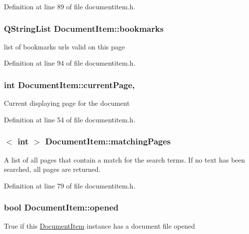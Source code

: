 Definition at line 89 of file documentitem.\+h.

\hypertarget{classDocumentItem_a08ec9ecae239f79e0e806efa28cc22b0}{
\subsubsection[{bookmarks}]{\setlength{\rightskip}{0pt plus 5cm}Q\+String\+List Document\+Item\+::bookmarks\hspace{0.3cm}{\ttfamily [read]}}}\label{classDocumentItem_a08ec9ecae239f79e0e806efa28cc22b0}
list of bookmarks urls valid on this page 

Definition at line 94 of file documentitem.\+h.

\hypertarget{classDocumentItem_aaf0a1ffedca483ef328739112fb2793b}{
\subsubsection[{current\+Page}]{\setlength{\rightskip}{0pt plus 5cm}int Document\+Item\+::current\+Page\hspace{0.3cm}{\ttfamily [read]}, {\ttfamily [write]}}}\label{classDocumentItem_aaf0a1ffedca483ef328739112fb2793b}
Current displaying page for the document 

Definition at line 54 of file documentitem.\+h.

\hypertarget{classDocumentItem_ad4148c970f6cd31b9b26115e3d7a1753}{
\subsubsection[{matching\+Pages}]{$<$ int $>$ Document\+Item\+::matching\+Pages\hspace{0.3cm}{\ttfamily [read]}}}\label{classDocumentItem_ad4148c970f6cd31b9b26115e3d7a1753}
A list of all pages that contain a match for the search terms. If no text has been searched, all pages are returned. 

Definition at line 79 of file documentitem.\+h.

\hypertarget{classDocumentItem_acc602f4248c496e5bcef51c9f98b1663}{
\subsubsection[{opened}]{\setlength{\rightskip}{0pt plus 5cm}bool Document\+Item\+::opened\hspace{0.3cm}{\ttfamily [read]}}}\label{classDocumentItem_acc602f4248c496e5bcef51c9f98b1663}
True if this \hyperlink{classDocumentItem}{Document\+Item} instance has a document file opened 

